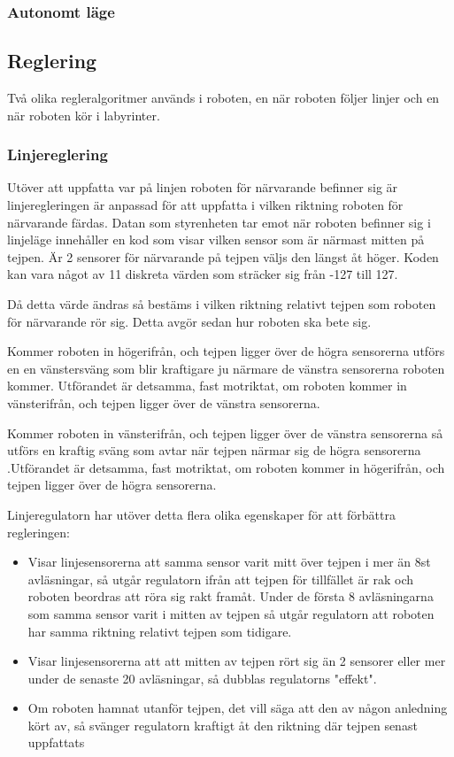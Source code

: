 \subsubsection{Autonomt läge}


\subsection{Reglering}
Två olika regleralgoritmer används i roboten, en när roboten följer linjer och
en när roboten kör i labyrinter.
\subsubsection{Linjereglering}
Utöver att uppfatta var på linjen roboten för närvarande befinner sig är 
linjeregleringen är anpassad för att uppfatta i vilken riktning roboten för 
närvarande färdas. Datan som styrenheten tar emot när roboten befinner sig i 
linjeläge innehåller en kod som visar vilken sensor som är närmast mitten på 
tejpen. Är 2 sensorer för närvarande på tejpen väljs den längst åt höger. 
Koden kan vara något av 11 diskreta värden som sträcker sig från -127 till 127.

Då detta värde ändras så bestäms i vilken riktning relativt tejpen som 
roboten för närvarande rör sig. Detta avgör sedan hur roboten ska bete sig.

Kommer roboten in högerifrån, och tejpen ligger över de högra sensorerna 
utförs en en vänstersväng som blir kraftigare ju närmare de vänstra 
sensorerna roboten kommer. Utförandet är detsamma, fast motriktat, om roboten 
kommer in vänsterifrån, och tejpen ligger över de vänstra sensorerna.

Kommer roboten in vänsterifrån, och tejpen ligger över de vänstra sensorerna 
så utförs en kraftig sväng som avtar när tejpen närmar sig de högra sensorerna
.Utförandet är detsamma, fast motriktat, om roboten kommer in högerifrån, och 
tejpen ligger över de högra sensorerna.


Linjeregulatorn har utöver detta flera olika egenskaper för att förbättra 
regleringen:
\begin{itemize}
\item Visar linjesensorerna att samma sensor varit mitt över tejpen i mer än 8st avläsningar, så utgår regulatorn ifrån att tejpen för tillfället är rak och roboten beordras att röra sig rakt framåt. Under de första 8 avläsningarna som samma sensor varit i mitten av tejpen så utgår regulatorn att roboten har samma riktning relativt tejpen som tidigare.
\item Visar linjesensorerna att att mitten av tejpen rört sig än 2 sensorer eller mer under de senaste 20 avläsningar, så dubblas regulatorns "effekt".
\item Om roboten hamnat utanför tejpen, det vill säga att den av någon anledning kört av, så svänger regulatorn kraftigt åt den riktning där tejpen senast uppfattats
\end{itemize}



